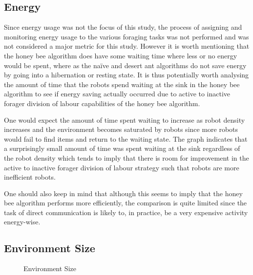 \subsection{Energy}
\label{results:energy}

Since energy usage was not the focus of this study, the process of assigning and monitoring energy usage to the various foraging tasks was not performed and was not considered a major metric for this study. However it is worth mentioning that the honey bee algorithm does have some waiting time where less or no energy would be spent, where as the na\"ive and desert ant algorithms do not save energy by going into a hibernation or resting state. It is thus potentially worth analysing the amount of time that the robots spend waiting at the sink in the honey bee algorithm to see if energy saving actually occurred due to active to inactive forager division of labour capabilities of the honey bee algorithm. 

One would expect the amount of time spent waiting to increase as robot density increases and the environment becomes saturated by robots since more robots would fail to find items and return to the waiting state. The graph indicates that a surprisingly small amount of time was spent waiting at the sink regardless of the robot density which tends to imply that there is room for improvement in the active to inactive forager division of labour strategy such that robots are more inefficient robots. 

One should also keep in mind that although this seems to imply that the honey bee algorithm performs more efficiently, the comparison is quite limited since the task of direct communication is likely to, in practice, be a very expensive activity energy-wise.

\subsection{Environment Size}
\label{results:environmentsize}




\begin{figure}[!htb]
\centering
\resizebox{\textwidth}{!}{}
\caption{Environment Size}
\label{sizegoldplot}
\end{figure}

